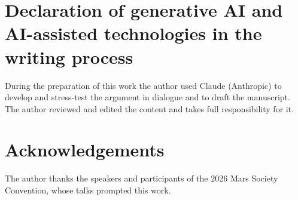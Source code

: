 \documentclass[preprint,12pt]{elsarticle}
\theoremstyle{definition}
\begin{document}
\section*{Declaration of generative AI and AI-assisted technologies in the writing process}
During the preparation of this work the author used Claude (Anthropic) to develop and stress-test the argument in dialogue and to draft the manuscript. The author reviewed and edited the content and takes full responsibility for it.

\section*{Acknowledgements}
The author thanks the speakers and participants of the 2026 Mars Society Convention, whose talks prompted this work.
\end{document}
